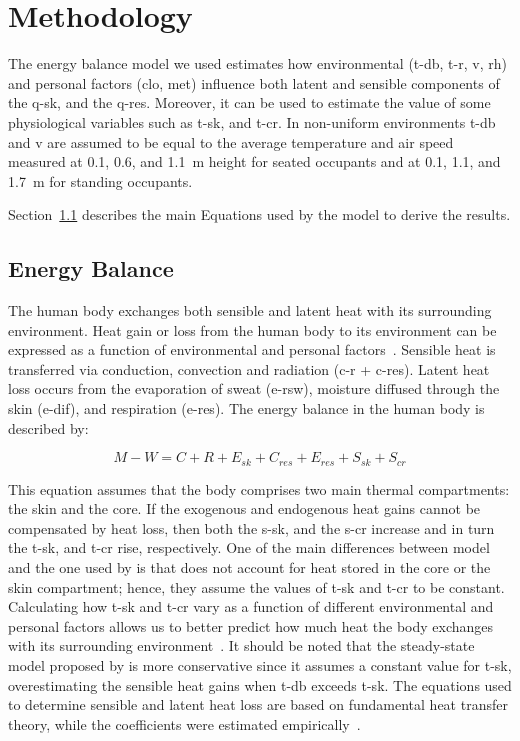 
\section{Methodology}\label{sec:methodology}

The energy balance model we used estimates how environmental (\ac{t-db}, \ac{t-r}, \ac{v}, \ac{rh}) and personal factors (\ac{clo}, \ac{met}) influence both latent and sensible components of the \ac{q-sk}, and the \ac{q-res}.
Moreover, it can be used to estimate the value of some physiological variables such as \ac{t-sk}, and \ac{t-cr}.
In non-uniform environments \ac{t-db} and \ac{v} are assumed to be equal to the average temperature and air speed measured at 0.1, 0.6, and 1.1~m height for seated occupants and at 0.1, 1.1, and 1.7~m for standing occupants.

Section~\ref{subsec:energy-balance} describes the main Equations used by the model to derive the results.

\subsection{Energy Balance}\label{subsec:energy-balance}

The human body exchanges both sensible and latent heat with its surrounding environment.
Heat gain or loss from the human body to its environment can be expressed as a function of environmental and personal factors~\cite{ASHRA2017}.
Sensible heat is transferred via conduction, convection and radiation (\acs{c-r} + \acs{c-res}).
Latent heat loss occurs from the evaporation of sweat (\acs{e-rsw}), moisture diffused through the skin  (\acs{e-dif}), and respiration (\acs{e-res}).
The energy balance in the human body is described by:

\begin{equation}
    M - W = C + R + E_{sk} + C_{res} + E_{res} + S_{sk} + S_{cr}\label{eq:heat-balance}
\end{equation}

This equation assumes that the body comprises two main thermal compartments: the skin and the core.
If the exogenous and endogenous heat gains cannot be compensated by heat loss, then both the \ac{s-sk}, and the \ac{s-cr} increase and in turn the \ac{t-sk}, and \ac{t-cr} rise, respectively.
One of the main differences between  model and the one used by  is that  does not account for heat stored in the core or the skin compartment;
hence, they assume the values of \ac{t-sk} and \ac{t-cr} to be constant.
Calculating how \ac{t-sk} and \ac{t-cr} vary as a function of different environmental and personal factors allows us to better predict how much heat the body exchanges with its surrounding environment~\cite{ASHRA2017}.
It should be noted that the steady-state model proposed by  is more conservative since it assumes a constant value for \ac{t-sk}, overestimating the sensible heat gains when \ac{t-db} exceeds \ac{t-sk}.
The equations used to determine sensible and latent heat loss are based on fundamental heat transfer theory, while the coefficients were estimated empirically~\cite{ASHRA2017}.


